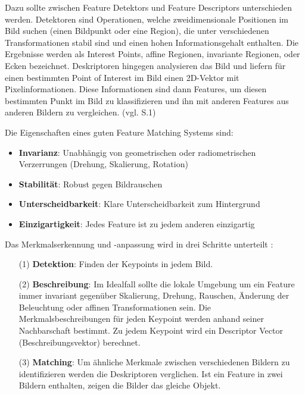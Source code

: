 Dazu sollte zwischen \glqq Feature Detektors\grqq{} und \glqq Feature Descriptors\grqq{} unterschieden werden. Detektoren sind Operationen, welche zweidimensionale Positionen im Bild suchen (einen Bildpunkt oder eine Region), die unter verschiedenen Transformationen stabil sind und einen hohen Informationsgehalt enthalten. Die Ergebnisse werden als \glqq Interest Points\grqq{}, affine Regionen, invariante Regionen, oder Ecken bezeichnet. Deskriptoren hingegen analysieren das Bild und liefern für einen bestimmten \glqq Point of Interest\grqq{} im Bild einen 2D-Vektor mit Pixelinformationen. Diese Informationen sind dann Features, um diesen bestimmten Punkt im Bild zu klassifizieren und ihn mit anderen Features aus anderen Bildern zu vergleichen. (vgl. \cite{det_des} S.1)


Die Eigenschaften eines guten Feature Matching Systems sind: 

\begin{itemize}
\item \textbf{Invarianz}: Unabhängig von geometrischen oder radiometrischen Verzerrungen (Drehung, Skalierung, Rotation)
\item \textbf{Stabilität}: Robust gegen Bildrauschen
\item \textbf{Unterscheidbarkeit}: Klare Unterscheidbarkeit zum Hintergrund
\item \textbf{Einzigartigkeit}: Jedes Feature ist zu jedem anderen einzigartig
\end{itemize}

Das Merkmalserkennung und -anpassung wird in drei Schritte unterteilt \cite{robust_feature}: 

\begin{itemize}
\item[(1)] \textbf{Detektion}: Finden der Keypoints in jedem Bild.
\item[(2)] \textbf{Beschreibung}: Im Idealfall sollte die lokale Umgebung um ein Feature immer invariant gegenüber Skalierung, Drehung, Rauschen, Änderung der Beleuchtung  oder affinen Transformationen sein. Die Merkmalsbeschreibungen für jeden Keypoint werden anhand seiner Nachbarschaft bestimmt. Zu jedem Keypoint wird ein \glqq Descriptor Vector\grqq{} (Beschreibungsvektor) berechnet.
\item[(3)] \textbf{Matching}: Um ähnliche Merkmale zwischen verschiedenen Bildern zu identifizieren werden die Deskriptoren verglichen. Ist ein Feature in zwei Bildern enthalten, zeigen die Bilder das gleiche Objekt.
\end{itemize}


